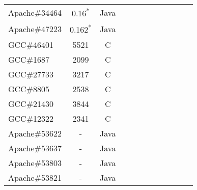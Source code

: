 \begin{table}[h!]
\begin{tabular}{lccccccccccc}
    Apache\#34464     &  0.16\textsuperscript{*}  & Java  &  &              &    &                                 &                   &                           &                    &&           \\
    Apache\#47223     &  0.162\textsuperscript{*} & Java  &  &              &    &                                 &                   &                           &                    &&           \\
    \midrule
    GCC\#46401        &  5521  & C  &  &              &    &                                 &                   &                           &                    &&            \\
    GCC\#1687         &  2099  & C  &  &              &    &                                 &                   &                           &                    &&           \\
    GCC\#27733        &  3217  & C  &  &              &    &                                 &                   &                           &                    &&           \\
    GCC\#8805         &  2538  & C  &  &              &    &                                 &                   &                           &                    &&            \\
    GCC\#21430        &  3844  & C  &  &              &    &                                 &                   &                           &                    &&            \\
    GCC\#12322        &  2341  & C  &  &              &    &                                 &                   &                           &                    &&           \\
    \midrule
    \midrule
    Apache\#53622     &  -  & Java  &  &              &    &                                 &                   &                           &                    &&           \\
    Apache\#53637     &  -  & Java  &  &              &    &                                 &                   &                           &                    &&          \\
    Apache\#53803     &  -  & Java  &  &              &    &                                 &                   &                           &                    &&            \\
    Apache\#53821     &  -  & Java  &  &              &    &                                 &                   &                           &                    &&           \\

\end{tabular}
\end{table}
